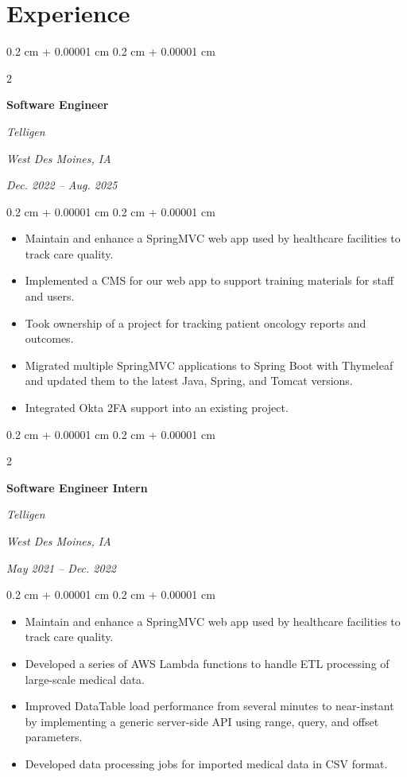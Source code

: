 \documentclass[10pt, letterpaper]{article}
\newenvironment{highlights}{
    \begin{itemize}[
        topsep=0.10 cm,
        parsep=0.10 cm,
        partopsep=0pt,
        itemsep=0pt,
        leftmargin=0.4 cm + 10pt
    ]
}{
    \end{itemize}
} %
\newenvironment{onecolentry}{
    \begin{adjustwidth}{
        0.2 cm + 0.00001 cm
    }{
        0.2 cm + 0.00001 cm
    }
}{
    \end{adjustwidth}
} %
\newenvironment{twocolentry}[2][]{
    \onecolentry
    \def\secondColumn{#2}
    \setcolumnwidth{\fill, 4.5 cm}
    \begin{paracol}{2}
}{
    \switchcolumn \raggedleft \secondColumn
    \end{paracol}
    \endonecolentry
} %
\begin{document}
\section{Experience}

\begin{twocolentry}{
		\textit{West Des Moines, IA}    
		            
		\textit{Dec. 2022 – Aug. 2025}}
	\textbf{Software Engineer}
	            
	\textit{Telligen}
\end{twocolentry}

\vspace{0.10 cm}
\begin{onecolentry}
	\begin{highlights}
		\item Maintain and enhance a SpringMVC web app used by healthcare facilities to track care quality.
		\item Implemented a CMS for our web app to support training materials for staff and users.
		\item Took ownership of a project for tracking patient oncology reports and outcomes.
		\item Migrated multiple SpringMVC applications to Spring Boot with Thymeleaf and updated them to the latest Java, Spring, and Tomcat versions.
		\item Integrated Okta 2FA support into an existing project.
	\end{highlights}
\end{onecolentry}

\vspace{0.2 cm}

\begin{twocolentry}{
		\textit{West Des Moines, IA}    
		            
		\textit{May 2021 – Dec. 2022}}
	\textbf{Software Engineer Intern}
	            
	\textit{Telligen}
\end{twocolentry}

\vspace{0.10 cm}
\begin{onecolentry}
	\begin{highlights}
    	\item Maintain and enhance a SpringMVC web app used by healthcare facilities to track care quality.
		\item Developed a series of AWS Lambda functions to handle ETL processing of large-scale medical data.
		\item Improved DataTable load performance from several minutes to near-instant by implementing a generic server-side API using range, query, and offset parameters.
		\item Developed data processing jobs for imported medical data in CSV format.
	\end{highlights}
\end{onecolentry}
\end{document}
